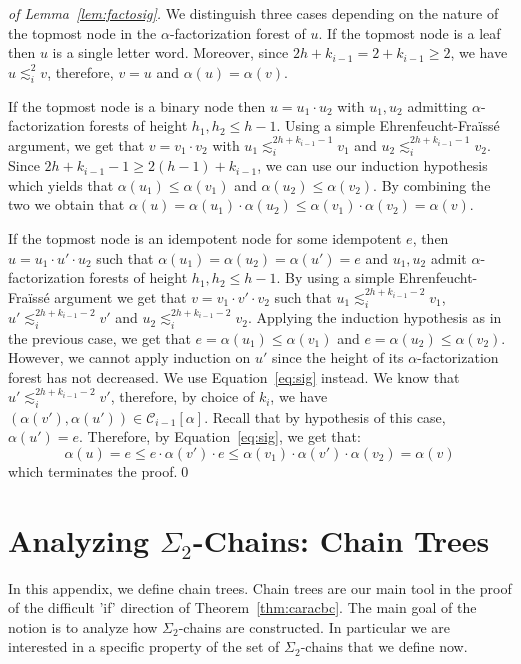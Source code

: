 \documentclass[envcountsame]{llncs}
\newcommand{\efgame}{Ehrenfeucht-Fra\"iss\'e\xspace}
\newcommand\Cs{\ensuremath{\mathcal{C}}\xspace}
\newcommand{\sic}[1]{\ensuremath{\Sigma_{#1}}\xspace}
\newcommand\sieq[2]{\ensuremath{\lesssim^{#1}_{#2}}\xspace}
\newcommand\lmo{\ensuremath{\leqslant}\xspace}
\let\leq\leqslant
\let\geq\geqslant
\newcommand\chain{chain\xspace}
\newcommand\qchains[1]{\ensuremath{\sic{#1}}-chains\xspace}
\newcommand\Chain{Chain\xspace}
\newcommand\qChains[1]{\ensuremath{\sic{#1}}-Chains\xspace}
\newcommand\dchains{\qchains{2}}
\newcommand\dChains{\qChains{2}}
\begin{document}
\begin{proof}[of Lemma~\ref{lem:factosig}]
  We distinguish three cases depending on the nature of the topmost node
  in the $\alpha$-factorization forest of $u$. If the topmost node is a
  leaf then $u$ is a single letter word. Moreover, since $2h + k_{i-1} =
  2 + k_{i-1} \geq 2$, we have $u \sieq{2}{i} v$, therefore, $v = u$ and
  $\alpha(u) = \alpha(v)$.

  If the topmost node is a binary node then $u = u_1\cdot u_2$ with
  $u_1,u_2$ admitting $\alpha$-factorization forests of height $h_1,h_2
  \leq h-1$. Using a simple \efgame argument, we get that $v = v_1 \cdot
  v_2$ with $u_1 \sieq{2h+k_{i-1}-1}{i} v_1$ and $u_2
  \sieq{2h+k_{i-1}-1}{i} v_2$. Since $2h +k_{i-1} -1 \geq 2(h-1) +k_{i-1}$,
  we can use our induction hypothesis which yields that $\alpha(u_1)
  \lmo \alpha(v_1)$ and $\alpha(u_2) \lmo \alpha(v_2)$. By combining the
  two we obtain that $\alpha(u) = \alpha(u_1) \cdot \alpha(u_2) \lmo
  \alpha(v_1) \cdot \alpha(v_2) = \alpha(v)$.


  If the topmost node is an idempotent node for some idempotent $e$,
  then $u=u_1\cdot u' \cdot u_2$ such that $\alpha(u_1) = \alpha(u_2) =
  \alpha(u') = e$ and $u_1,u_2$ admit $\alpha$-factorization forests of
  height $h_1,h_2 \leq h-1$. By using a simple \efgame argument we get
  that $v = v_1 \cdot v' \cdot v_2$ such that $u_1
  \sieq{2h+k_{i-1}-2}{i} v_1$, $u' \sieq{2h+k_{i-1}-2}{i} v'$ and $u_2
  \sieq{2h+k_{i-1}-2}{i} v_2$. Applying the induction hypothesis as in
  the previous case, we get that $e = \alpha(u_1) \lmo \alpha(v_1)$ and
  $e = \alpha(u_2) \lmo \alpha(v_2)$. However, we cannot apply induction
  on $u'$ since the height of its $\alpha$-factorization forest has not
  decreased. We use Equation~\eqref{eq:sig} instead. We know that $u'
  \sieq{2h+k_{i-1}-2}{i} v'$, therefore, by choice of $k_i$, we have
  $(\alpha(v'),\alpha(u')) \in \Cs_{i-1}[\alpha]$. Recall that by
  hypothesis of this case, $\alpha(u') = e$. Therefore, by
  Equation~\eqref{eq:sig}, we get that:
  \[
  \alpha(u) = e \lmo e \cdot \alpha(v') \cdot e \lmo \alpha(v_1) \cdot \alpha(v')
  \cdot \alpha(v_2) = \alpha(v)
  \]
  \noindent
  which terminates the proof.\qed
\end{proof}

\section{Analyzing \dChains: \Chain Trees}
\label{app:ctrees}
In this appendix, we define \chain trees. \Chain trees are our main
tool in the proof of the difficult 'if' direction of
Theorem~\ref{thm:caracbc}. The main goal of the notion is to analyze
how \dchains are constructed. In particular we are interested in a
specific property of the set of \dchains that we define now.
\end{document}
